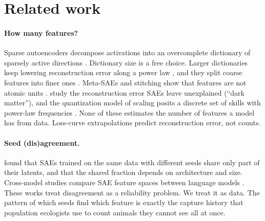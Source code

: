 \section{Related work}
\label{sec:related}

\paragraph{How many features?} Sparse autoencoders decompose activations into an overcomplete dictionary of sparsely active directions \citep{sharkey2022interim,cunningham2023sparse,bricken2023monosemanticity}. Dictionary size is a free choice. Larger dictionaries keep lowering reconstruction error along a power law \citep{gao2024scaling,templeton2024scaling}, and they split coarse features into finer ones \citep{bricken2023monosemanticity}. Meta-SAEs and stitching show that features are not atomic units \citep{leask2025sparse}. \citet{engels2024decomposing} study the reconstruction error SAEs leave unexplained (``dark matter''), and the quantization model of scaling posits a discrete set of skills with power-law frequencies \citep{michaud2023quantization}. None of these estimates the number of features a model has from data. Loss-curve extrapolations predict reconstruction error, not counts.

\paragraph{Seed (dis)agreement.} \citet{paulo2025sparse} found that SAEs trained on the same data with different seeds share only part of their latents, and that the shared fraction depends on architecture and size. Cross-model studies compare SAE feature spaces between language models \citep{lan2024sparse}. These works treat disagreement as a reliability problem. We treat it as data. The pattern of which seeds find which feature is exactly the capture history that population ecologists use to count animals they cannot see all at once.

